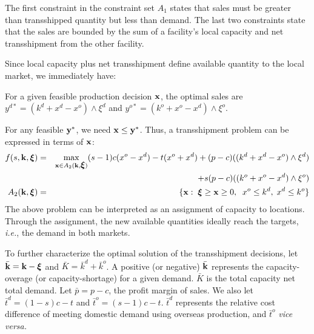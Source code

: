 \documentclass[mnsc,nonblindrev,copyedit]{informs2_wz} %
\newcommand{\xiv}{\mbox{\boldmath$\xi$}}
\begin{document}
The first constraint in the constraint set $A_1$ states that sales must be greater than transshipped quantity but less than demand.  The last two constraints state that the sales are bounded by the sum of a facility's local capacity and net transshipment from the other facility.

Since local capacity plus net transshipment define available quantity to the local market, we immediately have:


{\lemma For a given feasible production decision $\bold x$, the optimal sales are $y^{d*} =(k^d + x^d-x^o)\wedge \xi^d$ and $y^{o*} = (k^o+x^o-x^d)\wedge \xi^o$.
\label{lemma:baseSales}}

For any feasible $\bold y^*$, we need $\bold x \leq \bold y^*$.  Thus, a transshipment problem can be expressed in terms of $\bold x$:
\begin{eqnarray}
    f(s,\bold {k},\xiv) &=& \max_{\bold{x} \in A_2(\bold{k},\xiv)} (s-1)c(x^o -x^d)-t(x^o + x^d)+ (p-c)((k^d + x^d-x^o)\wedge \xi^d) \nonumber\\
    && + s(p-c)((k^o+x^o-x^d)\wedge \xi^o)  \label{eqn:transship}\\
     A_2(\bold{k},\xiv) &=& \{\bold{x}:\;  \xiv \geq \bold x \geq 0, \;\; x^o  \leq k^d,\; x^d \leq k^o\} \label{eqn:A2}
\end{eqnarray}
The above problem can be interpreted as an assignment of capacity to locations.  Through the assignment, the new available quantities ideally reach the targets, {\it i.e.}, the demand in both markets.

To further characterize the optimal solution of the transshipment decisions, let $\bar{\bold k} = \bold k - \xiv$ and $\bar{K} = \bar{k}^d+\bar{k}^o$.  A positive (or negative) $\bar{\bold k}$ represents the capacity-overage (or capacity-shortage) for a given demand.  $\bar{K}$ is the total capacity net total demand.  Let $\bar{p} = p-c$, the profit margin of sales.  We also let $\bar{t}^d = (1-s)c-t$ and $\bar{t}^o = (s-1)c-t$.  $\bar{t}^d$ represents the relative cost difference of meeting domestic demand using overseas production, and $\bar{t}^o$ {\it vice versa.}
\end{document}
